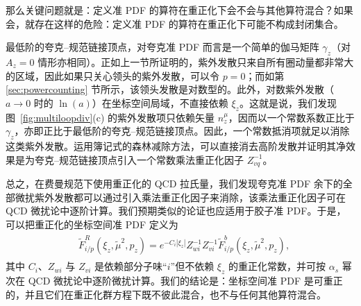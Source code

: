 那么关键问题就是：定义准 PDF 的算符在重正化下会不会与其他算符混合？如果会，就存在这样的危险：定义准 PDF 的算符在重正化下可能不构成封闭集合。

最低阶的夸克--规范链接顶点，对夸克准 PDF 而言是一个简单的伽马矩阵 $\gamma_z$（对 $A_z=0$ 情形亦相同）。正如上一节所证明的，紫外发散只来自所有圈动量都非常大的区域，因此如果只关心领头的紫外发散，可以令 $p=0$；而如第 \ref{sec:powercounting} 节所示，该领头发散是对数型的。此外，对数紫外发散（$a\to 0$ 时的 $\ln(a)$）在坐标空间局域，不直接依赖 $\xi_z$。这就是说，我们发现图~\ref{fig:multiloopdiv}(c) 的紫外发散项只依赖矢量 $n_z^\mu$，因而以一个常数系数正比于 $\gamma_z$，亦即正比于最低阶的夸克--规范链接顶点。因此，一个常数抵消项就足以消除这类紫外发散。运用簿记式的森林减除方法，可以直接消去高阶发散并证明其净效果是为夸克--规范链接顶点引入一个常数乘法重正化因子 $Z_{vq}^{-1}$。

总之，在费曼规范下使用重正化的 QCD 拉氏量，我们发现夸克准 PDF 余下的全部微扰紫外发散都可以通过引入乘法重正化因子来消除，该乘法重正化因子可在 QCD 微扰论中逐阶计算。我们预期类似的论证也应适用于胶子准 PDF。于是，可以把重正化的坐标空间准 PDF 定义为
\begin{align}\label{eq:renor}
\begin{split}
&\tilde{F}^{R}_{i/p}(\xi_z,\tilde{\mu}^2,p_z)=e^{-C_i |\xi_z|}Z_{wi}^{-1}Z_{vi}^{-1}\tilde{F}^{b}_{i/p}(\xi_z,\tilde{\mu}^2,p_z),
\end{split}
\end{align}
其中 $C_i$、$Z_{wi}$ 与 $Z_{vi}$ 是依赖部分子味``$i$''但不依赖 $\xi_z$ 的重正化常数，并可按 $\alpha_s$ 幂次在 QCD 微扰论中逐阶微扰计算。我们的结论是：坐标空间准 PDF 是可重正的，并且它们在重正化群方程下既不彼此混合，也不与任何其他算符混合。
